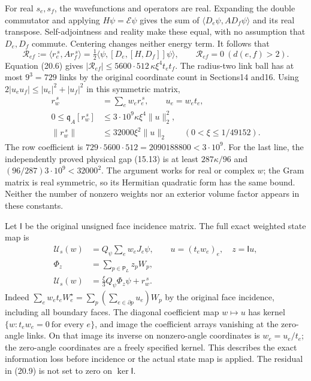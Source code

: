 \documentclass[
]{article}
\begin{document}
For real \(s_e,s_f\), the wavefunctions and operators are real.
Expanding the double commutator and applying \(H\psi=\mathcal E\psi\)
gives the sum of \(\langle D_e\psi,AD_f\psi\rangle\) and its real
transpose. Self-adjointness and reality make these equal, with no
assumption that \(D_e,D_f\) commute. Centering changes neither energy
term. It follows that \[
\mathcal R_{ef}:=\langle r_e^{\,s},Ar_f^{\,s}\rangle
=\tfrac12\langle\psi,[D_e,[H,D_f]]\psi\rangle,\qquad
\mathcal R_{ef}=0\ (d(e,f)>2).
                                                               \tag{20.7}
\] Equation (20.6) gives
\(|\mathcal R_{ef}|\le5600\cdot512\,\kappa\xi^4t_et_f\). The radius-two
link ball has at most \(9^3=729\) links by the original coordinate count
in Sections14 and16. Using \(2|u_eu_f|\le|u_e|^2+|u_f|^2\) in this
symmetric matrix, \[
\begin{aligned}
r_w^{\,s}&=\sum_e w_er_e^{\,s},\qquad u_e=w_et_e,\\
0\le\mathfrak q_A[r_w^{\,s}]
 &\le3\cdot10^9\kappa\xi^4\|u\|_2^2,\\
\|r_w^{\,s}\|&\le32000\xi^2\|u\|_2
 \qquad(0<\xi\le1/49152).
\end{aligned}                                                   \tag{20.8}
\] The row coefficient is
\(729\cdot5600\cdot512=2090188800<3\cdot10^9\). For the last line, the
independently proved physical gap (15.13) is at least \(287\kappa/96\)
and \((96/287)3\cdot10^9<32000^2\). The argument works for real or
complex \(w\); the Gram matrix is real symmetric, so its Hermitian
quadratic form has the same bound. Neither the number of nonzero weights
nor an exterior volume factor appears in these constants.

Let \(\mathsf I\) be the original unsigned face incidence matrix. The
full exact weighted state map is \[
\begin{aligned}
\mathcal U_s(w)&=Q_\psi\sum_e w_eJ_e\psi,\qquad
 u=(t_ew_e)_e,\quad z=\mathsf Iu,\\
\Phi_z&=\sum_{p\in\mathsf P_L}z_pW_p,\\
\mathcal U_s(w)&=\frac{\xi}{3}Q_\psi\Phi_z\psi+r_w^{\,s}.
\end{aligned}                                                   \tag{20.9}
\] Indeed \(\sum_ew_et_eW_e^\star=\sum_p(\sum_{e\in\partial p}u_e)W_p\)
by the original face incidence, including all boundary faces. The
diagonal coefficient map \(w\mapsto u\) has kernel
\(\{w:t_ew_e=0\ \text{for every }e\}\), and image the coefficient arrays
vanishing at the zero-angle links. On that image its inverse on
nonzero-angle coordinates is \(w_e=u_e/t_e\); the zero-angle coordinates
are a freely specified kernel. This describes the exact information loss
before incidence or the actual state map is applied. The residual in
(20.9) is not set to zero on \(\ker\mathsf I\).
\end{document}
